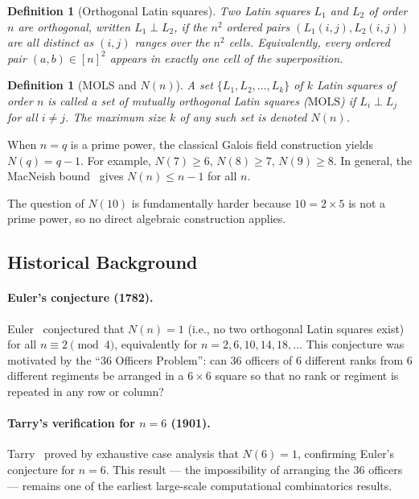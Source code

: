 \documentclass[11pt,a4paper]{article}
\newtheorem{definition}[theorem]{Definition}
\theoremstyle{remark}
\newcommand{\MOLS}{\mathrm{MOLS}}
\begin{document}
\begin{definition}[Orthogonal Latin squares]
Two Latin squares $L_1$ and $L_2$ of order $n$ are \emph{orthogonal}, written $L_1 \perp L_2$,
if the $n^2$ ordered pairs $(L_1(i,j), L_2(i,j))$ are all distinct as $(i,j)$ ranges over
the $n^2$ cells. Equivalently, every ordered pair $(a,b) \in [n]^2$ appears in exactly one
cell of the superposition.
\end{definition}

\begin{definition}[MOLS and $N(n)$]
A set $\{L_1, L_2, \ldots, L_k\}$ of $k$ Latin squares of order $n$ is called a set of
\emph{mutually orthogonal Latin squares} ($\MOLS$) if $L_i \perp L_j$ for all $i \neq j$.
The maximum size $k$ of any such set is denoted $N(n)$.
\end{definition}

When $n = q$ is a prime power, the classical Galois field construction yields $N(q) = q-1$.
For example, $N(7) \geq 6$, $N(8) \geq 7$, $N(9) \geq 8$. In general, the MacNeish
bound~\cite{macneish1922} gives $N(n) \leq n - 1$ for all $n$.

The question of $N(10)$ is fundamentally harder because $10 = 2 \times 5$ is not a prime
power, so no direct algebraic construction applies.

\subsection{Historical Background}

\paragraph{Euler's conjecture (1782).}
Euler~\cite{euler1782} conjectured that $N(n) = 1$ (i.e., no two orthogonal Latin squares
exist) for all $n \equiv 2 \pmod{4}$, equivalently for $n = 2, 6, 10, 14, 18, \ldots$
This conjecture was motivated by the ``36 Officers Problem'': can 36 officers of 6 different
ranks from 6 different regiments be arranged in a $6 \times 6$ square so that no rank or
regiment is repeated in any row or column?

\paragraph{Tarry's verification for $n=6$ (1901).}
Tarry~\cite{tarry1901} proved by exhaustive case analysis that $N(6) = 1$, confirming
Euler's conjecture for $n = 6$. This result --- the impossibility of arranging the 36 officers
--- remains one of the earliest large-scale computational combinatorics results.
\end{document}
